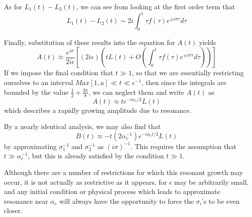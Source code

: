\documentclass[letterpaper,11pt,onecolumn,twoside,titlepage]{article}
\begin{document}
\begin{appendix}
As for $L_1(t) - L_2(t)$, we can see from looking at the first order term that
\[
L_1(t) - L_2(t) \sim 2i \int_0^t \tau f(\tau) e^{\pm i \sigma \tau} d\tau
\]

Finally, substitution of these results into the equation for $A(t)$ yields
\[
A(t) \approx \frac{e^{i\sigma}}{2i\epsilon}\left[(2i\epsilon)\left(tL(t) + O \left(\int_0^t \tau f(\tau) e^{\pm i \sigma \tau} d\tau \right) \right) \right]
\]
If we impose the final condition that $t \gg 1$, so that we are essentially restricting ourselves to an interval $Max[1,a] \ll t \ll \epsilon^{-1}$, then since the integrals are bounded by the value $\frac{1}{2} + \frac{3\pi}{8}$, we can neglect them and write $A(t)$ as
\[
A(t) \approx t e^{-i\alpha_c/2} L(t)
\]
which describes a rapidly growing amplitude due to resonance.

By a nearly identical analysis, we may also find that
\[
B(t) \approx -t \left(2 \alpha_c^{-1}\right) e^{-i \alpha_c t / 2} L(t)
\]
by approximating $\sigma_1^{-1}$ and $\sigma_2^{-1}$ as $(i\sigma)^{-1}$. This requires the assumption that $t \gg \alpha_c^{-1}$, but this is already satisfied by the condition $t \gg 1$.

Although there are a number of restrictions for which this resonant growth may occur, it is not actually as restrictive as it appears, for $\epsilon$ may be arbitrarily small, and any initial condition or physical process which leads to approximate resonance near $\alpha_c$ will always have the opportunity to force the $\sigma_i$'s to be even closer.

\end{appendix}

\clearpage{\pagestyle{empty}\cleardoublepage}



\end{document}
